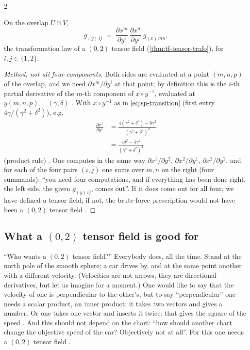 \begin{paracol}{2}
\begin{theorem}\label{thm:sp-metric}
On the overlap $U\cap V$,
\[
  g_{(y)\,ij}\;=\;\frac{\partial x^m}{\partial y^i}\,\frac{\partial x^n}{\partial y^j}\;g_{(x)\,mn},
\]
the transformation law of a $(0,2)$ tensor field (\cref{thm:tf-tensor-trafo}), for $i,j\in\{1,2\}$.
\end{theorem}
\begin{proof}[Method, not all four components]
Both sides are evaluated at a point $(m,n,p)$ of the overlap, and we need $\partial x^m/\partial y^i$ at that point; by definition this is the $i$-th partial
derivative of the $m$-th component of $x\circ y^{-1}$, evaluated at $y(m,n,p)=(\gamma,\delta)$ . With $x\circ y^{-1}$ as in \eqref{eq:sp-transition} (first entry
$4\gamma/(\gamma^2+\delta^2)$), e.g.
\begin{align*}
  \frac{\partial x^1}{\partial y^1}&=\frac{4(\gamma^2+\delta^2)-8\gamma^2}{(\gamma^2+\delta^2)^2}\\
  &=\frac{4\delta^2-4\gamma^2}{(\gamma^2+\delta^2)^2}
\end{align*}
(product rule) . One computes in the same way $\partial x^1/\partial y^2$, $\partial x^2/\partial y^1$, $\partial x^2/\partial y^2$, and for each of the
four pairs $(i,j)$ one sums over $m,n$ on the right (four summands): ``you need four computations, and if everything has been done right, the left side, the given $g_{(y)\,ij}$,
comes out''. If it does come out for all four, we have defined a tensor field; if not, the brute-force prescription would not have been a $(0,2)$ tensor
field .
\end{proof}

\subsection{What a $(0,2)$ tensor field is good for}

``Who wants a $(0,2)$ tensor field?'' Everybody does, all the time. Stand at the north pole of the smooth sphere; a car drives by, and at the same point
another with a different velocity. (Velocities are not arrows, they are directional derivatives, but let us imagine for a moment.) One would like to say that the
velocity of one is perpendicular to the other's; but to say ``perpendicular'' one needs a scalar product, an inner product: it takes two vectors and gives a
number. Or one takes one vector and inserts it twice: that gives the square of the speed . And this should not depend on the chart: ``how should another
chart change the objective speed of the car? Objectively not at all''. For this one needs a $(0,2)$ tensor field .


\end{paracol}
